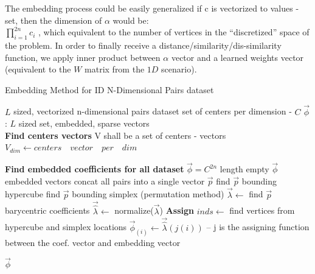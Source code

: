 \begin{}
\begin{figure}[h]
	\end{figure}
			
	The embedding process could be easily generalized if c is vectorized to values - set, then the dimension of $\alpha$ would be:\\ 
	$\prod_{i=1}^{2n}c_i$ , which equivalent to the number of vertices in the “discretized” space of the problem.
	In order to finally receive a distance/similarity/dis-similarity function, we apply inner product between $\alpha$  vector and a learned weights vector (equivalent to the $W$ matrix from the $1D$ scenario).
	
	
	
	\begin{algorithm}
				\caption{Embedding Method for ID N-Dimensional Pairs dataset}
				\begin{algorithmic}
				 
				
				\REQUIRE $L$ sized, vectorized n-dimensional pairs dataset
				\REQUIRE set of centers per dimension - $C$
				\ENSURE $\overrightarrow{\phi}$: $L$ sized set, embedded, sparse vectors\\
				
				\STATE \textbf{Find centers vectors}
				\STATE V shall be a set of centers - vectors
				\STATE $V_{dim} \leftarrow centers \quad vector \quad per \quad dim$
				\ENDFOR
				
				\STATE \textbf{Find embedded coefficients for all dataset}
				\STATE $\overrightarrow{\phi} = C^{2n}$ length empty $\overrightarrow{\phi}$ embedded vectors
				\STATE concat all pairs into a single vector $\overrightarrow{p}$
				\STATE find $\overrightarrow{p}$ bounding hypercube 
				\STATE find $\overrightarrow{p}$ bounding simplex (permutation method)
				\STATE $\overrightarrow{\lambda} \leftarrow$ find $\overrightarrow{p}$ barycentric coefficients 
				\STATE $\overrightarrow{\hat{\lambda}} \leftarrow$ normalize($\overrightarrow{\lambda}$)
				\ENDFOR
				\STATE \textbf{Assign}
				\STATE $inds \leftarrow$ find vertices from hypercube and simplex locations
				\STATE $\overrightarrow{\phi}_{(i)} \leftarrow \overrightarrow{\hat{\lambda}}(j(i))$ -- j is the assigning function between the coef. vector and embedding vector
				\ENDFOR
				\ENDFOR
				
				\RETURN $\overrightarrow{\phi}$
	
				
				\end{algorithmic}
			\end{algorithm}
	

\end{}
